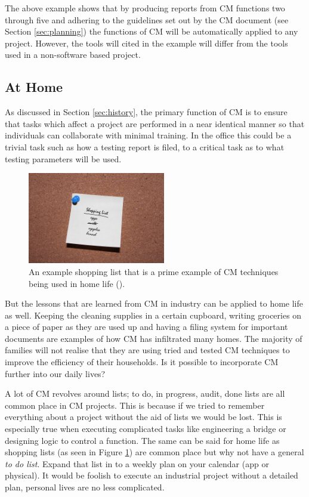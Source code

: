 \documentclass[cmpstyle]{ueacmpstyle}
\begin{document}
		The above example shows that by producing reports from CM functions two through five and adhering to the guidelines set out by the CM document (see Section \ref{sec:planning}) the functions of CM will be automatically applied to any project. However, the tools will cited in the example will differ from the tools used in a non-software based project. 
		
		\subsection{At Home} \label{sec:home}
		As discussed in Section \ref{sec:history}, the primary function of CM is to ensure that tasks which affect a project are performed in a near identical manner so that individuals can collaborate with minimal training. In the office this could be a trivial task such as how a testing report is filed, to a critical task as to what testing parameters will be used. 
		
		\begin{figure}
			\centering
			\includegraphics[height=4cm]{images/shopping-list.jpg}
			\caption{An example shopping list that is a prime example of CM techniques being used in home life (\cite{shopping-list}).} \label{fig:shopping}
		\end{figure}
	
		But the lessons that are learned from CM in industry can be applied to home life as well. Keeping the cleaning supplies in a certain cupboard, writing groceries on a piece of paper as they are used up and having a filing system for important documents are examples of how CM has infiltrated many homes. The majority of families will not realise that they are using tried and tested CM techniques to improve the efficiency of their households. Is it possible to incorporate CM further into our daily lives?
		
		A lot of CM revolves around lists; to do, in progress, audit, done lists are all common place in CM projects. This is because if we tried to remember everything about a project without the aid of lists we would be lost. This is especially true when executing complicated tasks like engineering a bridge or designing logic to control a function. The same can be said for home life as shopping lists (as seen in Figure \ref{fig:shopping}) are common place but why not have a general \emph{to do list}. Expand that list in to a weekly plan on your calendar (app or physical). It would be foolish to execute an industrial project without a detailed plan, personal lives are no less complicated. 
		
\end{document}
